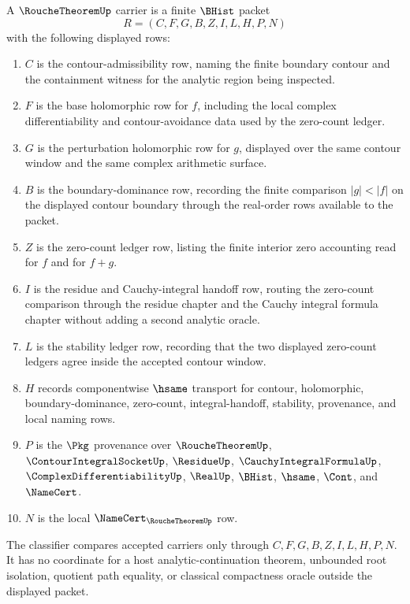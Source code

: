 \begin{definition}
\label{def:rouche-theorem-carrier}
A $\RoucheTheoremUp$ carrier is a finite $\BHist$ packet
$$
R=(C,F,G,B,Z,I,L,H,P,N)
$$
with the following displayed rows:
\begin{enumerate}
\item $C$ is the contour-admissibility row, naming the finite boundary contour and the containment witness for the analytic region being inspected.
\item $F$ is the base holomorphic row for $f$, including the local complex differentiability and contour-avoidance data used by the zero-count ledger.
\item $G$ is the perturbation holomorphic row for $g$, displayed over the same contour window and the same complex arithmetic surface.
\item $B$ is the boundary-dominance row, recording the finite comparison $|g|<|f|$ on the displayed contour boundary through the real-order rows available to the packet.
\item $Z$ is the zero-count ledger row, listing the finite interior zero accounting read for $f$ and for $f+g$.
\item $I$ is the residue and Cauchy-integral handoff row, routing the zero-count comparison through the residue chapter and the Cauchy integral formula chapter without adding a second analytic oracle.
\item $L$ is the stability ledger row, recording that the two displayed zero-count ledgers agree inside the accepted contour window.
\item $H$ records componentwise $\hsame$ transport for contour, holomorphic, boundary-dominance, zero-count, integral-handoff, stability, provenance, and local naming rows.
\item $P$ is the $\Pkg$ provenance over $\RoucheTheoremUp$, $\ContourIntegralSocketUp$, $\ResidueUp$, $\CauchyIntegralFormulaUp$, $\ComplexDifferentiabilityUp$, $\RealUp$, $\BHist$, $\hsame$, $\Cont$, and $\NameCert$.
\item $N$ is the local $\NameCert_{\RoucheTheoremUp}$ row.
\end{enumerate}
The classifier compares accepted carriers only through $C,F,G,B,Z,I,L,H,P,N$. It has no coordinate for a host analytic-continuation theorem, unbounded root isolation, quotient path equality, or classical compactness oracle outside the displayed packet.
\end{definition}

